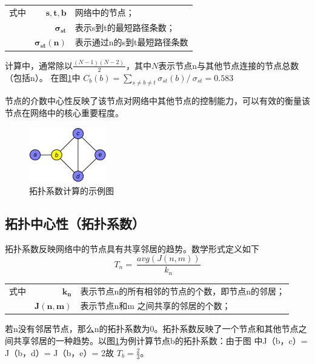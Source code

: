 \begin{tabularx}{\textwidth}{@{}l@{\quad}r@{———}X@{}}
式中 & $\boldsymbol{s,t,b}$ &  网络中的节点；\\
	& $\boldsymbol{ \sigma_{st}}$ &   表示s到t的最短路径条数；\\
	& $\boldsymbol{\sigma_{st}( n)}$ &	表示通过n的s到t最短路径条数 \\
\end{tabularx}\vspace{3.15bp}
计算中，通常除以$\frac{( N-1)( N-2) \ }{2}$，其中$N$表示节点n与其他节点连接的节点总数（包括n）。
在图\ref{fig25}中 $C_{b}( b) =\sum\limits _{s\neq b\neq t} \sigma_{st}( b) /\ \sigma_{st} =  0.583$

节点的介数中心性反映了该节点对网络中其他节点的控制能力，可以有效的衡量该节点在网络中的核心重要程度。



\begin{figure}[h]
\centering
\includegraphics[width = 0.3\textwidth]{toplog}
\caption[fig25]{拓扑系数计算的示例图}
\label{fig25}
\end{figure}

\subsection{拓扑中心性（拓扑系数）}
拓扑系数反映网络中的节点具有共享邻居的趋势。数学形式定义如下
\begin{equation}\label{eq25}
	T_{n} =\ \frac{avg( J( n,m))}{k_{n}}
\end{equation}
\begin{tabularx}{\textwidth}{@{}l@{\quad}r@{———}X@{}}
式中 & $\boldsymbol{k_{n}}$ &  表示节点n的所有相邻的节点的个数，即节点n的邻居；\\
	& $\boldsymbol{ J( n,m)}$ &   表示节点n和m  之间共享的邻居的个数；\\
\end{tabularx}\vspace{3.15bp}
若n没有邻居节点，那么n的拓扑系数为0。拓扑系数反映了一个节点和其他节点之间共享邻居的一种趋势。以图\ref{fig25}为例计算节点b的拓扑系数：由于图 中J（b，c）= J（b，d）= J（b，e）= 2故 $T_{b}=\frac{2}{3}$。


